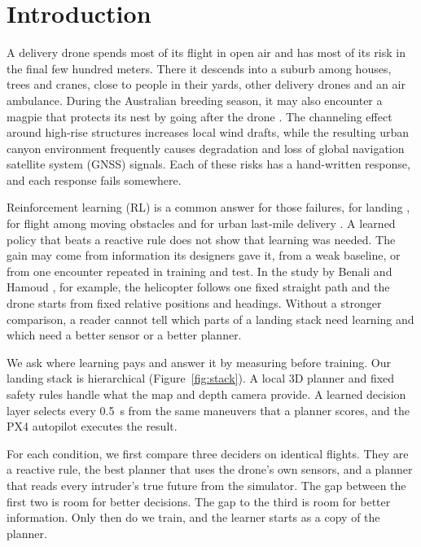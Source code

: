 \section{Introduction}

A delivery drone spends most of its flight in open air and has most of its risk in the final few hundred meters. There it descends into a suburb among houses, trees and cranes, close to people in their yards, other delivery drones and an air ambulance. During the Australian breeding season, it may also encounter a magpie that protects its nest by going after the drone \cite{lyons2018}. The channeling effect around high-rise structures increases local wind drafts, while the resulting urban canyon environment frequently causes degradation and loss of global navigation satellite system (GNSS) signals. Each of these risks has a hand-written response, and each response fails somewhere.

Reinforcement learning (RL) is a common answer for those failures, for landing \cite{polvara2020,amendola2024}, for flight among moving obstacles \cite{xu2025navrl} and for urban last-mile delivery \cite{benali2026}. A learned policy that beats a reactive rule does not show that learning was needed. The gain may come from information its designers gave it, from a weak baseline, or from one encounter repeated in training and test. In the study by Benali and Hamoud , for example, the helicopter follows one fixed straight path and the drone starts from fixed relative positions and headings. Without a stronger comparison, a reader cannot tell which parts of a landing stack need learning and which need a better sensor or a better planner.

We ask where learning pays and answer it by measuring before training. Our landing stack is hierarchical (Figure~\ref{fig:stack}). A local 3D planner and fixed safety rules handle what the map and depth camera provide. A learned decision layer selects every 0.5~s from the same maneuvers that a planner scores, and the PX4 autopilot \cite{meier2015} executes the result.

For each condition, we first compare three deciders on identical flights. They are a reactive rule, the best planner that uses the drone's own sensors, and a planner that reads every intruder's true future from the simulator. The gap between the first two is room for better decisions. The gap to the third is room for better information. Only then do we train, and the learner starts as a copy of the planner.


